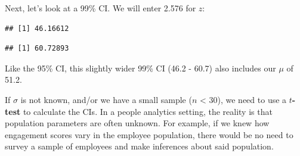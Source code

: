 \documentclass[]{book}
\newenvironment{Shaded}{\begin{snugshade}}{\end{snugshade}}
\newcommand{\CommentTok}[1]{\textcolor[rgb]{0.56,0.35,0.01}{\textit{#1}}}
\newcommand{\DecValTok}[1]{\textcolor[rgb]{0.00,0.00,0.81}{#1}}
\newcommand{\FloatTok}[1]{\textcolor[rgb]{0.00,0.00,0.81}{#1}}
\newcommand{\KeywordTok}[1]{\textcolor[rgb]{0.13,0.29,0.53}{\textbf{#1}}}
\newcommand{\NormalTok}[1]{#1}
\newcommand{\OperatorTok}[1]{\textcolor[rgb]{0.81,0.36,0.00}{\textbf{#1}}}
\newcommand{\StringTok}[1]{\textcolor[rgb]{0.31,0.60,0.02}{#1}}
\begin{document}
Next, let's look at a 99\% CI. We will enter 2.576 for \(z\):

\begin{Shaded}
\end{Shaded}

\begin{Shaded}
\end{Shaded}

\begin{verbatim}
## [1] 46.16612
\end{verbatim}

\begin{Shaded}
\end{Shaded}

\begin{verbatim}
## [1] 60.72893
\end{verbatim}

Like the 95\% CI, this slightly wider 99\% CI (46.2 - 60.7) also includes our \(\mu\) of 51.2.

If \(\sigma\) is not known, and/or we have a small sample (\(n\) \textless{} 30), we need to use a \(t\)\textbf{-test} to calculate the CIs. In a people analytics setting, the reality is that population parameters are often unknown. For example, if we knew how engagement scores vary in the employee population, there would be no need to survey a sample of employees and make inferences about said population.
\end{document}
